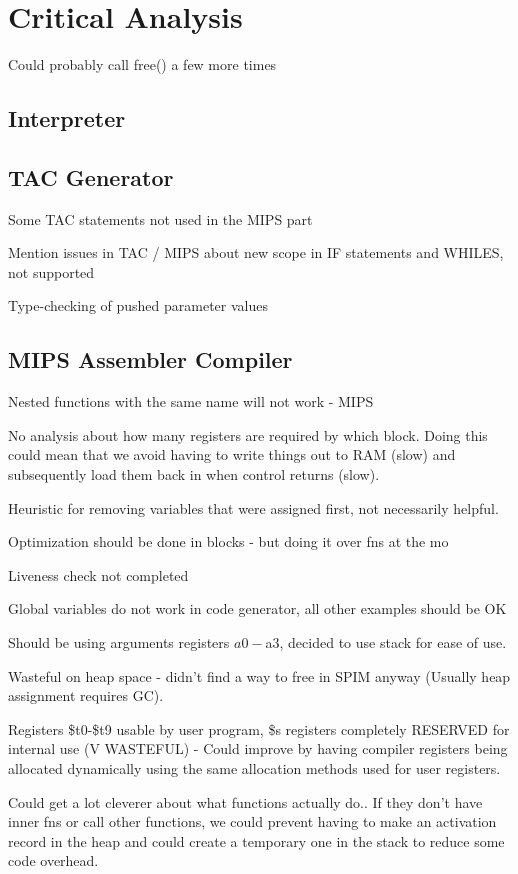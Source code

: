 \chapter{Critical Analysis}

Could probably call free() a few more times


\section{Interpreter}

\section{TAC Generator}
Some TAC statements not used in the MIPS part

Mention issues in TAC / MIPS about new scope in IF statements and WHILES, not supported

Type-checking of pushed parameter values


\section{MIPS Assembler Compiler}
Nested functions with the same name will not work - MIPS 

No analysis about how many registers are required by which block. Doing this could mean that we avoid having to write things out to RAM (slow) and subsequently load them back in when control returns (slow).

Heuristic for removing variables that were assigned first, not necessarily helpful.

Optimization should be done in blocks - but doing it over fns at the mo

Liveness check not completed

Global variables do not work in code generator, all other examples should be OK


Should be using arguments registers $a0-$a3, decided to use stack for ease of use.


Wasteful on heap space - didn't find a way to free in SPIM anyway (Usually heap assignment requires GC).

Registers \$t0-\$t9 usable by user program, \$s registers completely RESERVED for internal use (V WASTEFUL) - Could improve by having compiler registers being allocated dynamically using the same allocation methods used for user registers.


Could get a lot cleverer about what functions actually do.. If they don't have inner fns or call other functions, we could prevent having to make an activation record in the heap and could create a temporary one in the stack to reduce some code overhead. 
